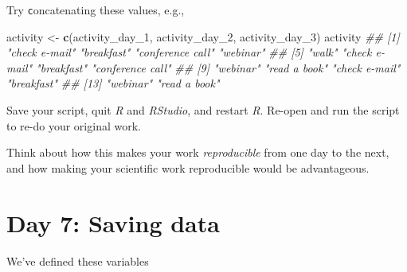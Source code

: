 \documentclass[
]{book}
\newenvironment{Shaded}{\begin{snugshade}}{\end{snugshade}}
\newcommand{\CommentTok}[1]{\textcolor[rgb]{0.56,0.35,0.01}{\textit{#1}}}
\newcommand{\DecValTok}[1]{\textcolor[rgb]{0.00,0.00,0.81}{#1}}
\newcommand{\KeywordTok}[1]{\textcolor[rgb]{0.13,0.29,0.53}{\textbf{#1}}}
\newcommand{\NormalTok}[1]{#1}
\newcommand{\StringTok}[1]{\textcolor[rgb]{0.31,0.60,0.02}{#1}}
\begin{document}
Try \texttt{c}oncatenating these values, e.g.,

\begin{Shaded}
\begin{Highlighting}[]
\NormalTok{activity <-}\StringTok{ }\KeywordTok{c}\NormalTok{(activity_day_}\DecValTok{1}\NormalTok{, activity_day_}\DecValTok{2}\NormalTok{, activity_day_}\DecValTok{3}\NormalTok{)}
\NormalTok{activity}
\CommentTok{##  [1] "check e-mail"    "breakfast"       "conference call" "webinar"        }
\CommentTok{##  [5] "walk"            "check e-mail"    "breakfast"       "conference call"}
\CommentTok{##  [9] "webinar"         "read a book"     "check e-mail"    "breakfast"      }
\CommentTok{## [13] "webinar"         "read a book"}
\end{Highlighting}
\end{Shaded}

Save your script, quit \emph{R} and \emph{RStudio}, and restart \emph{R}. Re-open and run the script to re-do your original work.

Think about how this makes your work \emph{reproducible} from one day to the next, and how making your scientific work reproducible would be advantageous.

\hypertarget{day-7-saving-data}{%
\section{Day 7: Saving data}\label{day-7-saving-data}}

We've defined these variables
\end{document}
